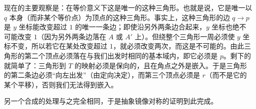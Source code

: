 
现在的主要观察是：在等价意义下这是唯一的这种三角形。也就是说，它是唯一以 $q$ 本身（而非某个等价点）为顶点的这种三角形。事实上，这种三角形的边 $q\to p$ 是 $y$ 坐标能改变超过 $1$ 的唯一一条边；即使沿另外两条边合起来，$y$ 坐标也绝不可能改变 $1$（因为另外两条边落在 $A$ 或 $A'$ 上）。但绕整个三角形一周必须使 $y$ 坐标不变，所以若它在某处改变超过 $1$，就必须改变两次，而这是不可能的。由此三角形的第二个顶点必须落在与我们出发时相同的基本域内，即它必须是 $p$。剩下的就简单了：三角形到 $T$ 的映射必须是保向的，且在角点之外是嵌入。于是三角形的第二条边必须“向左出发”（由定向决定），而第三个顶点必须是 $r$（而不是它的某个平移），否则我们无法得到嵌入。

另一个合成的处理与之完全相同，于是抽象镜像对称的证明到此完成。

